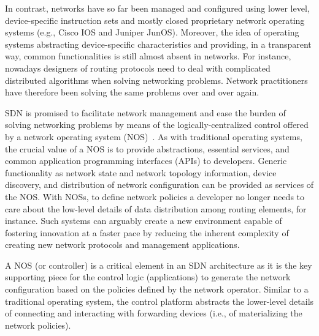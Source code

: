 In contrast, networks have so far been managed and configured using lower level, device-specific instruction 
sets and mostly closed proprietary network operating systems (e.g., Cisco IOS and Juniper JunOS). 
Moreover, the idea of operating systems abstracting device-specific characteristics 
and providing, in a transparent way, common functionalities is still almost absent in networks.
For instance, nowadays designers of routing protocols need to deal with complicated distributed algorithms when solving networking problems.
Network practitioners have therefore been solving the same problems over and over again.

SDN is promised to facilitate network management and ease the burden of solving networking problems by means of the logically-centralized control offered by a network operating system (NOS)~\cite{gude2008}.
As with traditional operating systems, the crucial value of a NOS is to provide abstractions, essential services, 
and common application programming interfaces (APIs) to developers. 
Generic functionality as network state and network topology information, device discovery, and distribution of network configuration can be provided as services of the NOS.
With NOSs, to define network policies a developer no longer needs to care about the low-level details of data distribution among routing elements, for instance.
Such systems can arguably create a new environment capable of fostering innovation at a faster pace by reducing the inherent complexity of creating new network protocols and management applications.

A NOS (or controller) is a critical element in an SDN architecture as it is the key supporting piece 
for the control logic (applications) to generate the network configuration based on the policies defined by the network operator. 
Similar to a traditional operating system, the control platform abstracts the lower-level details of connecting and interacting with forwarding devices (i.e., of materializing the network policies).

